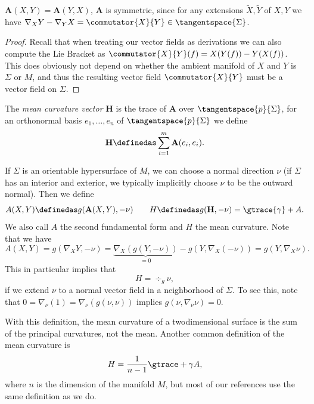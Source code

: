 \documentclass[titlepage,numbers=noenddot,headinclude,oneside,%
footinclude=true,cleardoublepage=empty,%
BCOR=5mm,paper=a4,fontsize=11pt,%
english,%
]{scrartcl}
\begin{document}
{\begin{fact}
    \( \mathbf{A}(X,Y)=\mathbf{A}(Y,X) \), \ie \( \mathbf{A} \) is symmetric, since for any extensions \( \tilde{X},\tilde{Y} \) of \( X,Y \) we have \( \Mconnection_X Y-\Mconnection_Y X=\commutator{X}{Y}\in \tangentspace{\Sigma} \).
\end{fact}
\begin{proof}
    Recall that when treating our vector fields as derivations we can also compute the Lie Bracket  as \( \commutator{X}{Y}(f)=X(Y(f))-Y(X(f)) \). This does obviously not depend on whether the ambient manifold of \( X \) and \( Y \) is \( \Sigma \) or \( M \), and thus the resulting vector field \( \commutator{X}{Y} \) must be a vector field on \( \Sigma \). 
\end{proof}
\begin{definition}
    The \emph{mean curvature vector} \( \mathbf{H} \) is the trace of \( \mathbf{A} \) over \( \tangentspace{p}{\Sigma} \), \ie for an orthonormal basis \( e_1,\dotsc,e_n \) of \( \tangentspace{p}{\Sigma} \) we define
    \begin{equation*}
        \mathbf{H}\definedas \sum_{i=1}^{m}\mathbf{A}(e_i,e_i).
    \end{equation*}
\end{definition}
If \( \Sigma \) is an orientable hypersurface of \( M \), we can choose a normal direction \( \nu \) (if \( \Sigma \) has an interior and exterior, we typically implicitly choose \( \nu \) to be the outward normal). Then we define
\begin{equation*}
    A(X,Y)\definedas g(\mathbf{A}(X,Y),-\nu)\qquad H\definedas g(\mathbf{H},-\nu)=\gtrace{\gamma}+{A}.\label{eq:def_mean_curvature}
\end{equation*}
We also call \( A \) the second fundamental form and \( H \) the mean curvature. Note that we have
\begin{equation*}
    A(X,Y)=g(\nabla_X Y,-\nu)=\underbrace{\nabla_X (g(Y,-\nu))}_{=0}-g(Y,\nabla_X (-\nu))=g(Y,\nabla_X \nu).
\end{equation*}
This in particular implies that
\begin{equation*}
    H=\div_g \nu,
\end{equation*}
if we extend \( \nu \) to a normal vector field in a neighborhood of \( \Sigma \). To see this, note that \( 0=\nabla_\nu(1)=\nabla_{\nu}(g(\nu,\nu)) \) implies \( g(\nu,\nabla_\nu \nu)=0 \).
\begin{remark}\label{rem:mean_curvature_peculiarities}
    With this definition, the mean curvature of a twodimensional surface is the sum of the principal curvatures, not the mean. Another common definition of the mean curvature is
    \begin{equation*}
        H=\frac{1}{n-1}\gtrace+{\gamma}{A},
    \end{equation*}
    where \( n \) is the dimension of the manifold \( M \), but most of our references use the same definition as we do.


\end{remark}}
\end{document}
